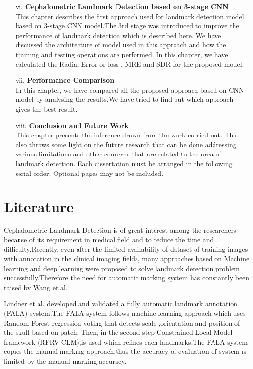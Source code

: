 \documentclass[sn-mathphys]{sn-jnl}%
\theoremstyle{thmstyleone}%
\theoremstyle{thmstyletwo}%
\theoremstyle{thmstylethree}%
\begin{document}
\begin{itemize}
\item[vi.] \textbf{ Cephalometric Landmark Detection based on 3-stage CNN}\\
This chapter describes the first approach used for  landmark detection model based on 3-stage CNN model.The 3rd stage was introduced to improve the performance of landmark detection which is described here. We have discussed the architecture of model used in this approach and how the training and testing operations are performed. In this chapter, we have calculated the Radial Error or loss , MRE and SDR  for the proposed model.

\item[vii.]\textbf{Performance Comparison}\\
In this chapter, we have compared all the proposed approach based on CNN model by analysing the results.We have tried to find out which approach gives the best result.

\item[viii.] \textbf{Conclusion and Future Work}\\
This chapter presents the inference drawn from the work carried out. This also throws some light on the future research that can be done addressing various limitations and other concerns that are related to the area of landmark detection. Each dissertation must be arranged in the following serial order. Optional pages may not be included.
\end{itemize}

\section{Literature}\label{Literature_survey}
Cephalometric Landmark Detection is of great interest among the researchers because of its requirement in medical field and to reduce the time and difficulty.Recently, even after the limited availability of dataset of training images with annotation in the clinical imaging fields, many approaches based on Machine learning and deep learning were proposed to solve landmark detection problem successfully.Therefore the need for automatic marking system has constantly been raised by Wang et al. \cite{wang2015evaluation}  

Lindner et al. \cite{lindner2016fully} developed and validated a fully automatic landmark annotation (FALA) system.The FALA system follows machine learning approach which uses Random Forest regression-voting  that detects scale ,orientation and position of the skull based on patch. Then, in the second step Constrained Local Model framework (RFRV-CLM),is used which refines each landmarks.The FALA system copies the manual marking approach,thus the accuracy of  evaluation of system is limited by the manual marking accuracy. 
\end{document}
